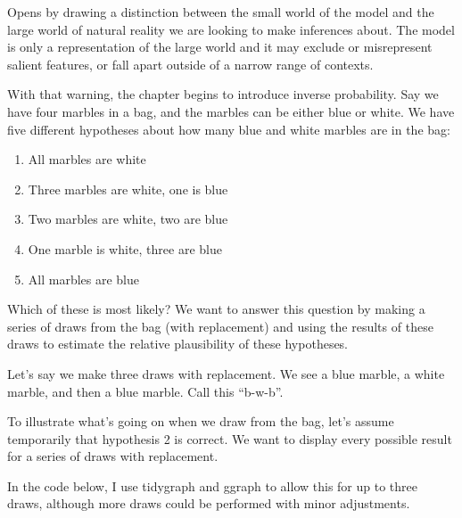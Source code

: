 \documentclass[
]{book}
\providecommand{\tightlist}{%
  \setlength{\itemsep}{0pt}\setlength{\parskip}{0pt}}
\begin{document}
Opens by drawing a distinction between the small world of the model and the large world of natural reality we are looking to make inferences about. The model is only a representation of the large world and it may exclude or misrepresent salient features, or fall apart outside of a narrow range of contexts.

With that warning, the chapter begins to introduce inverse probability. Say we have four marbles in a bag, and the marbles can be either blue or white. We have five different hypotheses about how many blue and white marbles are in the bag:

\begin{enumerate}
\def\labelenumi{\arabic{enumi}.}
\tightlist
\item
  All marbles are white
\item
  Three marbles are white, one is blue
\item
  Two marbles are white, two are blue
\item
  One marble is white, three are blue
\item
  All marbles are blue
\end{enumerate}

Which of these is most likely? We want to answer this question by making a series of draws from the bag (with replacement) and using the results of these draws to estimate the relative plausibility of these hypotheses.

Let's say we make three draws with replacement. We see a blue marble, a white marble, and then a blue marble. Call this ``b-w-b''.

To illustrate what's going on when we draw from the bag, let's assume temporarily that hypothesis 2 is correct. We want to display every possible result for a series of draws with replacement.

In the code below, I use tidygraph and ggraph to allow this for up to three draws, although more draws could be performed with minor adjustments.
\end{document}
